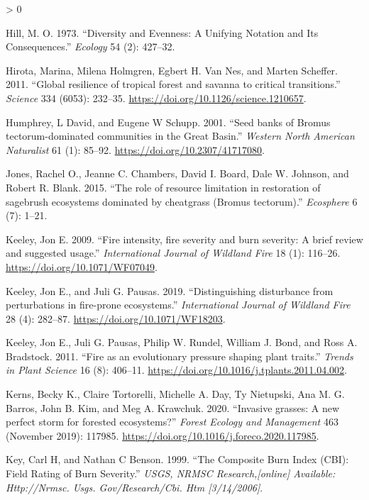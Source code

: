\documentclass[
  12pt,
]{article}
\newlength{\cslhangindent}
\newenvironment{CSLReferences}[2] %
 {%
  \setlength{\parindent}{0pt}
  \ifodd #1 \everypar{\setlength{\hangindent}{\cslhangindent}}\ignorespaces\fi
  \ifnum #2 > 0
  \setlength{\parskip}{#2\baselineskip}
  \fi
 }%
 {}
\begin{document}
\begin{CSLReferences}{1}{0}
\leavevmode\hypertarget{ref-Hill1973}{}%
Hill, M. O. 1973. {``{Diversity and Evenness: A Unifying Notation and
Its Consequences}.''} \emph{Ecology} 54 (2): 427--32.

\leavevmode\hypertarget{ref-Hirota2011}{}%
Hirota, Marina, Milena Holmgren, Egbert H. Van Nes, and Marten Scheffer.
2011. {``{Global resilience of tropical forest and savanna to critical
transitions}.''} \emph{Science} 334 (6053): 232--35.
\url{https://doi.org/10.1126/science.1210657}.

\leavevmode\hypertarget{ref-Humphrey2001}{}%
Humphrey, L David, and Eugene W Schupp. 2001. {``{Seed banks of Bromus
tectorum-dominated communities in the Great Basin}.''} \emph{Western
North American Naturalist} 61 (1): 85--92.
\url{https://doi.org/10.2307/41717080}.

\leavevmode\hypertarget{ref-Jones2015}{}%
Jones, Rachel O., Jeanne C. Chambers, David I. Board, Dale W. Johnson,
and Robert R. Blank. 2015. {``{The role of resource limitation in
restoration of sagebrush ecosystems dominated by cheatgrass (Bromus
tectorum)}.''} \emph{Ecosphere} 6 (7): 1--21.

\leavevmode\hypertarget{ref-Keeley2009}{}%
Keeley, Jon E. 2009. {``{Fire intensity, fire severity and burn
severity: A brief review and suggested usage}.''} \emph{International
Journal of Wildland Fire} 18 (1): 116--26.
\url{https://doi.org/10.1071/WF07049}.

\leavevmode\hypertarget{ref-Keeley2019}{}%
Keeley, Jon E., and Juli G. Pausas. 2019. {``{Distinguishing disturbance
from perturbations in fire-prone ecosystems}.''} \emph{International
Journal of Wildland Fire} 28 (4): 282--87.
\url{https://doi.org/10.1071/WF18203}.

\leavevmode\hypertarget{ref-Keeley2011}{}%
Keeley, Jon E., Juli G. Pausas, Philip W. Rundel, William J. Bond, and
Ross A. Bradstock. 2011. {``{Fire as an evolutionary pressure shaping
plant traits}.''} \emph{Trends in Plant Science} 16 (8): 406--11.
\url{https://doi.org/10.1016/j.tplants.2011.04.002}.

\leavevmode\hypertarget{ref-Kerns2020}{}%
Kerns, Becky K., Claire Tortorelli, Michelle A. Day, Ty Nietupski, Ana
M. G. Barros, John B. Kim, and Meg A. Krawchuk. 2020. {``{Invasive
grasses: A new perfect storm for forested ecosystems?}''} \emph{Forest
Ecology and Management} 463 (November 2019): 117985.
\url{https://doi.org/10.1016/j.foreco.2020.117985}.

\leavevmode\hypertarget{ref-Key1999}{}%
Key, Carl H, and Nathan C Benson. 1999. {``The Composite Burn Index
(CBI): Field Rating of Burn Severity.''} \emph{USGS, NRMSC
Research,{[}online{]} Available: Http://Nrmsc. Usgs. Gov/Research/Cbi.
Htm {[}3/14/2006{]}}.


\end{CSLReferences}
\end{document}
